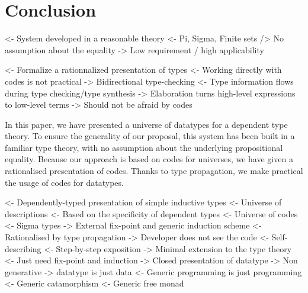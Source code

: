 \documentclass[authoryear]{sigplanconf}
\newenvironment{wstructure}{\comment}{\endcomment}
\begin{document}









\section{Conclusion}

\begin{wstructure}
<- System developed in a reasonable theory
    <- Pi, Sigma, Finite sets
    /> No assumption about the equality
    -> Low requirement / high applicability
\end{wstructure}

\begin{wstructure}
<- Formalize a rationnalized presentation of types
    <- Working directly with codes is not practical
    -> Bidirectional type-checking
        <- Type information flows during type checking/type synthesis
        -> Elaboration turns high-level expressions to low-level terms
    -> Should not be afraid by codes
\end{wstructure}

In this paper, we have presented a universe of datatypes for a
dependent type theory. To ensure the generality of our proposal, this
system has been built in a familiar type theory, with no assumption
about the underlying propositional equality. Because our approach is
based on codes for universes, we have given a rationalised
presentation of codes. Thanks to type propagation, we make practical
the usage of codes for datatypes.

\begin{wstructure}
<- Dependently-typed presentation of simple inductive types
    <- Universe of descriptions
        <- Based on the specificity of dependent types
            <- Universe of codes
            <- Sigma types
        -> External fix-point and generic induction scheme
    <- Rationalised by type propagation
        -> Developer does not see the code
    <- Self-describing
        <- Step-by-step exposition
        -> Minimal extension to the type theory
            <- Just need fix-point and induction
        -> Closed presentation of datatype
            -> Non generative
        -> datatype is just data
    <- Generic programming is just programming
        <- Generic catamorphism
        <- Generic free monad
\end{wstructure}
\end{document}
